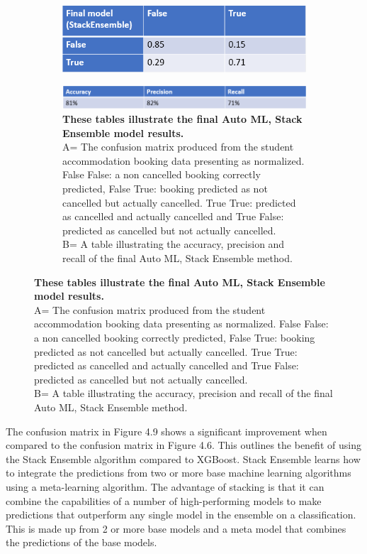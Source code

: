 \begin{figure}[H]
 \centering
  \begin{subfigure}{A\textwidth}
    \includegraphics[width=10cm]{figures/azure_ml_confusion_matrix.png}
  \end{subfigure}

  \centering
  \begin{subfigure}{B\textwidth}
    \includegraphics[width=10cm]{figures/final_recall.png}
    \caption{\textbf{These tables illustrate the final Auto ML, Stack Ensemble model results.}\vspace{2mm} \\ A= The confusion matrix produced from the student accommodation booking data presenting as normalized. False False: a non cancelled booking correctly predicted, False True: booking predicted as not cancelled but actually cancelled. True True: predicted as cancelled and actually cancelled and True False: predicted as cancelled but not actually cancelled. \vspace{2mm} \\B= A table illustrating the accuracy, precision and recall of the final Auto ML, Stack Ensemble method.} \label{fig:1b}
  \end{subfigure}
\end{figure}

The confusion matrix in Figure 4.9 shows a significant improvement when compared to the confusion matrix in Figure 4.6. This outlines the benefit of using the Stack Ensemble algorithm compared to XGBoost. Stack Ensemble learns how to integrate the predictions from two or more base machine learning algorithms using a meta-learning algorithm. The advantage of stacking is that it can combine the capabilities of a number of high-performing models to make predictions that outperform any single model in the ensemble on a classification. This is made up from 2 or more base models and a meta model that combines the predictions of the base models.

\vspace{5mm}

